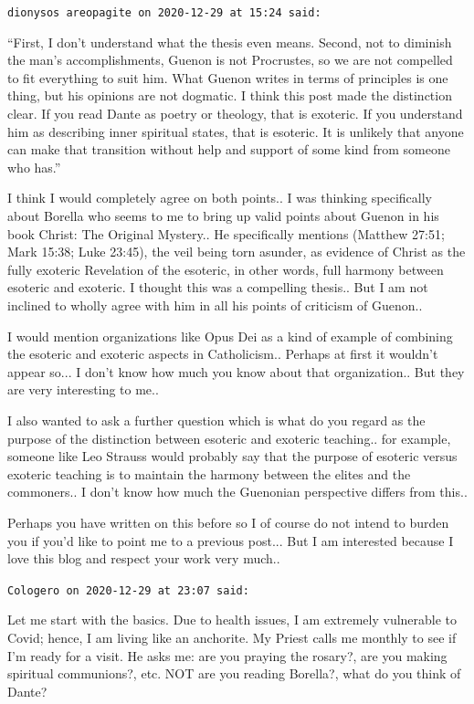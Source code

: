 \begin{footnotesize}
\begin{sffamily}
\hfill

\texttt{dionysos areopagite on 2020-12-29 at 15:24 said:}

``First, I don't understand what the thesis even means. Second, not to diminish the man's accomplishments, Guenon is not Procrustes, so we are not compelled to fit everything to suit him. What Guenon writes in terms of principles is one thing, but his opinions are not dogmatic. I think this post made the distinction clear. If you read Dante as poetry or theology, that is exoteric. If you understand him as describing inner spiritual states, that is esoteric. It is unlikely that anyone can make that transition without help and support of some kind from someone who has.''

I think I would completely agree on both points.. I was thinking specifically about Borella who seems to me to bring up valid points about Guenon in his book Christ: The Original Mystery.. He specifically mentions (Matthew 27:51; Mark 15:38; Luke 23:45), the veil being torn asunder, as evidence of Christ as the fully exoteric Revelation of the esoteric, in other words, full harmony between esoteric and exoteric. I thought this was a compelling thesis.. But I am not inclined to wholly agree with him in all his points of criticism of Guenon..

I would mention organizations like Opus Dei as a kind of example of combining the esoteric and exoteric aspects in Catholicism.. Perhaps at first it wouldn't appear so... I don't know how much you know about that organization.. But they are very interesting to me..

I also wanted to ask a further question which is what do you regard as the purpose of the distinction between esoteric and exoteric teaching.. for example, someone like Leo Strauss would probably say that the purpose of esoteric versus exoteric teaching is to maintain the harmony between the elites and the commoners.. I don't know how much the Guenonian perspective differs from this..

Perhaps you have written on this before so I of course do not intend to burden you if you'd like to point me to a previous post... But I am interested because I love this blog and respect your work very much..

\hfill

\texttt{Cologero on 2020-12-29 at 23:07 said:}

Let me start with the basics. Due to health issues, I am extremely vulnerable to Covid; hence, I am living like an anchorite. My Priest calls me monthly to see if I'm ready for a visit. He asks me: are you praying the rosary?, are you making spiritual communions?, etc. NOT are you reading Borella?, what do you think of Dante?


\end{sffamily}
\end{footnotesize}
